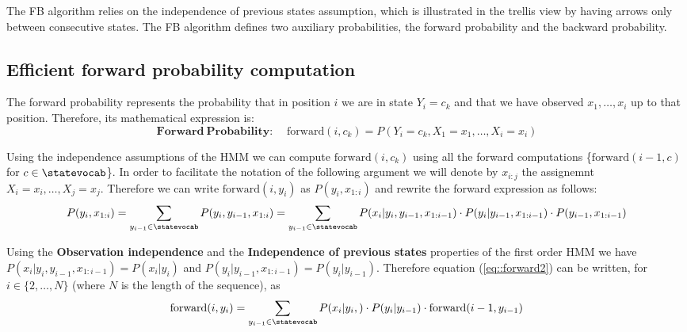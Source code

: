 The FB algorithm relies on the independence of previous states
assumption, which  
is illustrated in the trellis view by having arrows only between consecutive states. 
The FB algorithm defines two auxiliary probabilities, the forward probability and the backward probability. 

\subsection*{Efficient forward probability computation}
The forward probability represents the probability that in position
$i$ we are in state $Y_i = c_k$ and that we have observed $x_1,\ldots,x_i$
up to that position. Therefore, its mathematical expression is:
\begin{equation}
\label{eq::forward}
\mathbf{Forward \ Probability\!:}\;\;\;\;  \mathrm{forward}(i, c_k) = P(Y_i = c_k, X_1=x_1,\ldots, X_i = x_i)
\end{equation}

Using the independence assumptions of the HMM we can compute $\mathrm{forward}(i, c_k)$ using all the forward computations \{$\mathrm{forward}(i -1, c)$ for $c \in \statevocab$\}. In order to facilitate the notation of the following argument we will denote by $x_{i:j}$  the assignemnt $X_i = x_i, \dots, X_j = x_j$. Therefore we can write   $\mathrm{forward}(i, y_i) $ as $P( y_i, x_{1:i } ) $ and rewrite the forward expression as follows:
\begin{equation}
\label{eq::forward2}
  P( y_i, x_{1:i } ) =  \sum_{y_{i-1} \in \statevocab} P( y_i ,y_{i-1}, x_{1:i } )  =  \sum_{y_{i-1} \in \statevocab} P( x_i  | y_i,  y_{i-1},  x_{1:i-1 } ) \cdot P(y_i  | y_{i-1},  x_{1:i-1 }) \cdot P(y_{i-1},  x_{1:i-1 })  
\end{equation}

Using the \textbf{Observation independence} and the \textbf{Independence of previous states} properties of the first order HMM we have $P( x_i  | y_i,  y_{i-1},  x_{1:i-1 } ) = P( x_i  | y_i) $ and $P(y_i  | y_{i-1},  x_{1:i-1 })  = P(y_i  | y_{i-1})  $. Therefore equation (\ref{eq::forward2}) can be written, 
for $i \in \{2,\dots,N\}$ (where $N$ is the length of the sequence), as 
\begin{equation}
\label{eq::forward3}
 \mathrm{forward}(i, y_i)  = \sum_{y_{i-1} \in \statevocab} P( x_i  | y_i, ) \cdot P(y_i  | y_{i-1}) \cdot \mathrm{forward}(i-1, y_{i-1})   
\end{equation}

